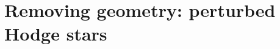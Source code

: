 \documentclass[preprint,12pt]{elsarticle}
\begin{document}
%
%
%
%


\section{Removing geometry: perturbed Hodge stars}
\label{sec:geometry}

%
%
%
%
%
%
\end{document}
